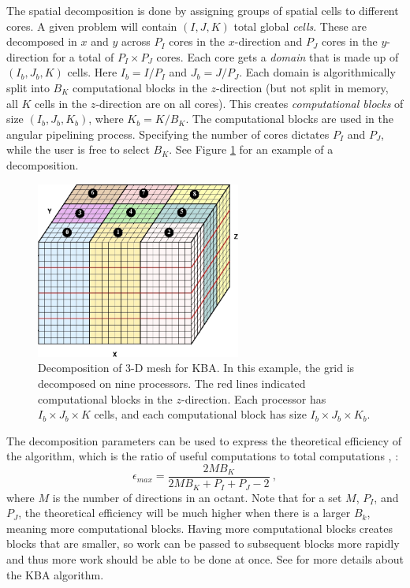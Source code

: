 The spatial decomposition is done by assigning groups of spatial cells to different cores. A given problem will contain $(I, J, K)$ total global \emph{cells}. These are decomposed in $x$ and $y$ across $P_{I}$ cores in the $x$-direction and $P_{J}$ cores in the $y$-direction for a total of $P_{I} \times P_{J}$ cores. Each core gets a \emph{domain} that is made up of $(I_{b}, J_{b}, K)$ cells. Here $I_{b} = I/P_{I}$ and $J_{b} = J/P_{J}$. Each domain is algorithmically split into $B_{K}$ computational blocks in the $z$-direction (but not split in memory, all $K$ cells in the $z$-direction are on all cores). This creates \emph{computational blocks} of size $(I_{b}, J_{b}, K_{b})$, where $K_{b} = K/B_{K}$. The computational blocks are used in the angular pipelining process. Specifying the number of cores dictates $P_{I}$ and $P_{J}$, while the user is free to select $B_{K}$. See Figure \ref{fig:BlockDecomp} for an example of a decomposition.

\begin{figure}[!ht]	
  \begin{center}
    \includegraphics [width=0.6\textwidth, height=0.4\textheight ] {BlockDecompCropped}
  \end{center}
  \caption{Decomposition of 3-D mesh for KBA. In this example, the grid is decomposed on nine processors. The red lines indicated computational blocks in the $z$-direction. Each processor has $I_{b} \times J_{b} \times K$ cells, and each computational block has size $I_{b} \times J_{b} \times K_{b}$.}
  \label{fig:BlockDecomp}
\end{figure}

The decomposition parameters can be used to express the theoretical efficiency of the algorithm, which is the ratio of useful computations to total computations \cite{Evans2009d}, \cite{Baker1998}:
%
\begin{equation}
  \epsilon_{max} = \frac{2MB_{K}}{2MB_{K} + P_{I} + P_{J} - 2} \:, 
  \label{eq:efficiency}
\end{equation}
%
where $M$ is the number of directions in an octant. Note that for a set $M$, $P_{I}$, and $P_{J}$, the theoretical efficiency will be much higher when there is a larger $B_{k}$, meaning more computational blocks. Having more computational blocks creates blocks that are smaller, so work can be passed to subsequent blocks more rapidly and thus more work should be able to be done at once. See \cite{Baker1998} for more details about the KBA algorithm.

